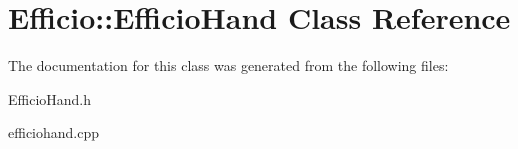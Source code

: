 \hypertarget{class_efficio_1_1_efficio_hand}{}\section{Efficio\+:\+:Efficio\+Hand Class Reference}
\label{class_efficio_1_1_efficio_hand}


The documentation for this class was generated from the following files\+:\begin{DoxyCompactItemize}
\item 
Efficio\+Hand.\+h\item 
efficiohand.\+cpp\end{DoxyCompactItemize}
